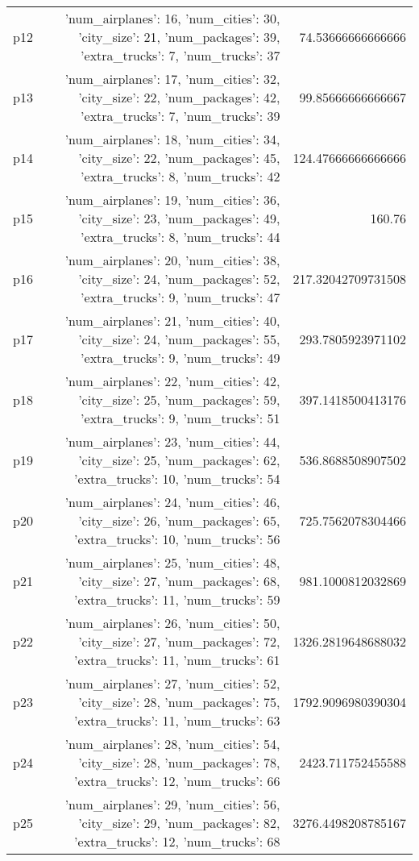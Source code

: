 \documentclass{article}
\begin{document}
\begin{center}
\begin{tabular}{r|r|r}
  p12&{'num\_airplanes': 16, 'num\_cities': 30, 'city\_size': 21, 'num\_packages': 39, 'extra\_trucks': 7, 'num\_trucks': 37}&74.53666666666666\\
  p13&{'num\_airplanes': 17, 'num\_cities': 32, 'city\_size': 22, 'num\_packages': 42, 'extra\_trucks': 7, 'num\_trucks': 39}&99.85666666666667\\
  p14&{'num\_airplanes': 18, 'num\_cities': 34, 'city\_size': 22, 'num\_packages': 45, 'extra\_trucks': 8, 'num\_trucks': 42}&124.47666666666666\\
  p15&{'num\_airplanes': 19, 'num\_cities': 36, 'city\_size': 23, 'num\_packages': 49, 'extra\_trucks': 8, 'num\_trucks': 44}&160.76\\
  p16&{'num\_airplanes': 20, 'num\_cities': 38, 'city\_size': 24, 'num\_packages': 52, 'extra\_trucks': 9, 'num\_trucks': 47}&217.32042709731508\\
  p17&{'num\_airplanes': 21, 'num\_cities': 40, 'city\_size': 24, 'num\_packages': 55, 'extra\_trucks': 9, 'num\_trucks': 49}&293.7805923971102\\
  p18&{'num\_airplanes': 22, 'num\_cities': 42, 'city\_size': 25, 'num\_packages': 59, 'extra\_trucks': 9, 'num\_trucks': 51}&397.1418500413176\\
  p19&{'num\_airplanes': 23, 'num\_cities': 44, 'city\_size': 25, 'num\_packages': 62, 'extra\_trucks': 10, 'num\_trucks': 54}&536.8688508907502\\
  p20&{'num\_airplanes': 24, 'num\_cities': 46, 'city\_size': 26, 'num\_packages': 65, 'extra\_trucks': 10, 'num\_trucks': 56}&725.7562078304466\\
  p21&{'num\_airplanes': 25, 'num\_cities': 48, 'city\_size': 27, 'num\_packages': 68, 'extra\_trucks': 11, 'num\_trucks': 59}&981.1000812032869\\
  p22&{'num\_airplanes': 26, 'num\_cities': 50, 'city\_size': 27, 'num\_packages': 72, 'extra\_trucks': 11, 'num\_trucks': 61}&1326.2819648688032\\
  p23&{'num\_airplanes': 27, 'num\_cities': 52, 'city\_size': 28, 'num\_packages': 75, 'extra\_trucks': 11, 'num\_trucks': 63}&1792.9096980390304\\
  p24&{'num\_airplanes': 28, 'num\_cities': 54, 'city\_size': 28, 'num\_packages': 78, 'extra\_trucks': 12, 'num\_trucks': 66}&2423.711752455588\\
  p25&{'num\_airplanes': 29, 'num\_cities': 56, 'city\_size': 29, 'num\_packages': 82, 'extra\_trucks': 12, 'num\_trucks': 68}&3276.4498208785167\\

\end{tabular}
\end{center}
\end{document}
